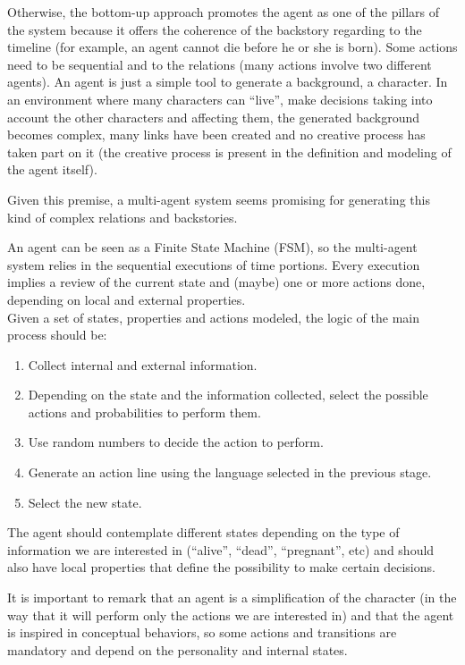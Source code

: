 \documentclass[letterpaper]{article}
\begin{document}
Otherwise, the bottom-up approach promotes the agent as one of the pillars of the system because it offers the coherence of the backstory regarding to the timeline (for example, an agent cannot die before he or she is born). Some actions need to be sequential and to the relations (many actions involve two different agents). An agent is just a simple tool to generate a background, a character. In an environment where many characters can ``live'', make decisions taking into account the other characters and affecting them, the generated background becomes complex, many links have been created and no creative process has taken part on it (the creative process is present in the definition and modeling of the agent itself).

Given this premise, a multi-agent system seems promising for generating this kind of complex relations and backstories.

An agent can be seen as a Finite State Machine (FSM), so the multi-agent system relies in the sequential executions of time portions. Every execution implies a review of the current state and (maybe) one or more actions done, depending on local and external properties.\\

Given a set of states, properties and actions modeled, the logic of the main process should be:

\begin{enumerate}
\item Collect internal and external information.
\item Depending on the state and the information collected, select the possible actions and probabilities to perform them.
\item Use random numbers to decide the action to perform.
\item Generate an action line using the language selected in the previous stage.
\item Select the new state.
\end{enumerate}


The agent should contemplate different states depending on the type of information we are interested in (``alive'', ``dead'', ``pregnant'', etc) and should also have local properties that define the possibility to make certain decisions.

It is important to remark that an agent is a simplification of the character (in the way that it will perform only the actions we are interested in) and that the agent is inspired in conceptual behaviors, so some actions and transitions are mandatory and depend on the personality and internal states.\\
\end{document}
